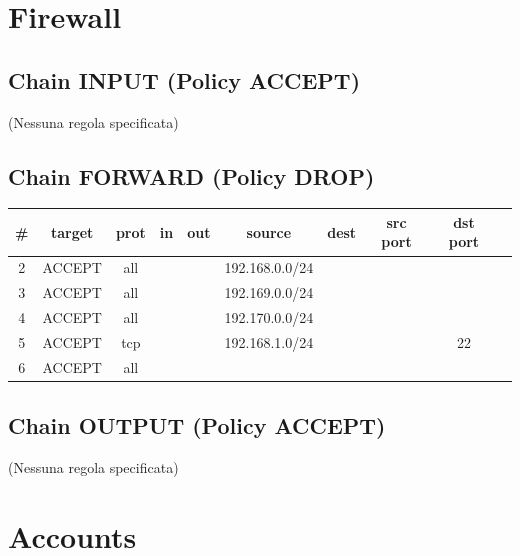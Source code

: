 \documentclass[a4paper,12pt]{article}
\begin{document}
\section{Firewall} \label{6-firewall}

\subsection*{Chain INPUT (Policy ACCEPT)}
(Nessuna regola specificata)

\subsection*{Chain FORWARD (Policy DROP)}
\begin{longtable}{cccccccccc}
\toprule
\# & target & prot & in & out & source & dest & src port & dst port \\
\midrule
2 & ACCEPT & all & & & 192.168.0.0/24 & & & \\
3 & ACCEPT & all & & & 192.169.0.0/24 & & & \\
4 & ACCEPT & all & & & 192.170.0.0/24 & & & \\
5 & ACCEPT & tcp & & & 192.168.1.0/24 & & & 22 \\
6 & ACCEPT & all & & & & & & \\
\bottomrule
\end{longtable}

\subsection*{Chain OUTPUT (Policy ACCEPT)}
(Nessuna regola specificata)

\section{Accounts} \label{7-accounts}
\end{document}
